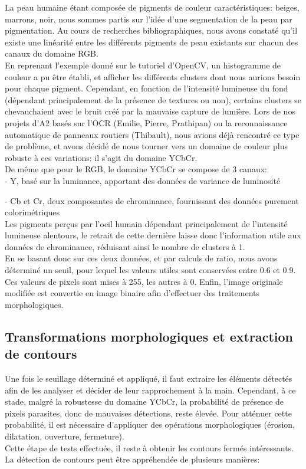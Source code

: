 \documentclass[10pt,a4paper]{report}
\begin{document}
La peau humaine étant composée de pigments de couleur caractéristiques: beiges, marrons, noir, nous sommes partis sur l'idée d'une segmentation de la peau par pigmentation. Au cours de recherches bibliographiques, nous avons constaté qu'il existe une linéarité entre les différents pigments de peau existants sur chacun des canaux du domaine RGB.\\
\newline En reprenant l'exemple donné sur le tutoriel d'OpenCV, un histogramme de couleur a pu être établi, et afficher les différents clusters dont nous aurions besoin pour chaque pigment. Cependant, en fonction de l'intensité lumineuse du fond (dépendant principalement de la présence de textures ou non), certains clusters se chevauchaient avec le bruit créé par la mauvaise capture de lumière. Lors de nos projets d'A2 basés sur l'OCR (Emilie, Pierre, Prathipan) ou la reconnaissance automatique de panneaux routiers (Thibault), nous avions déjà rencontré ce type de problème, et avons décidé de nous tourner vers un domaine de couleur plus robuste à ces variations: il s'agit du domaine YCbCr.\\
De même que pour le RGB, le domaine YCbCr se compose de 3 canaux:\\

- Y, basé sur la luminance, apportant des données de variance de luminosité

- Cb et Cr, deux composantes de chrominance, fournissant des données purement colorimétriques\\
\newline
Les pigments perçus par l'oeil humain dépendant principalement de l'intensité lumineuse alentours, le retrait de cette dernière laisse donc l'information utile aux données de chrominance, réduisant ainsi le nombre de clusters à 1.\\
En se basant donc sur ces deux données, et par calculs de ratio, nous avons déterminé un seuil, pour lequel les valeurs utiles sont conservées entre 0.6 et 0.9. Ces valeurs de pixels sont mises à 255, les autres à 0. Enfin, l'image originale modifiée est convertie en image binaire afin d'effectuer des traitements morphologiques.

\subsection{Transformations morphologiques et extraction de contours}
Une fois le seuillage déterminé et appliqué, il faut extraire les éléments détectés afin de les analyser et décider de leur rapprochement à la main. Cependant, à ce stade, malgré la robustesse du domaine YCbCr, la probabilité de présence de pixels parasites, donc de mauvaises détections, reste élevée. Pour atténuer cette probabilité, il est nécessaire d'appliquer des opérations morphologiques (érosion, dilatation, ouverture, fermeture).\\
Cette étape de tests effectuée, il reste à obtenir les contours fermés intéressants. La détection de contours peut être appréhendée de plusieurs manières:\\
\end{document}
